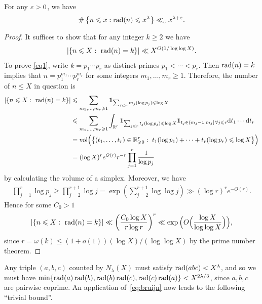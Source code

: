 \begin{lemma}\label{lem:deBruijnRadical}
  For any $\varepsilon>0$, we have
  \begin{equation}\label{eq:bruijn}
    \#\left\{n\leqslant x : \operatorname{rad}(n)\leqslant x^\lambda\right\} \ll_\varepsilon x^{\lambda+\varepsilon}.
  \end{equation}
\end{lemma}
\begin{proof}

  It suffices to show that for any integer $k\geq 2$ we have
  \begin{align}\label{eq1}
  |\{n\leqslant X:\,\, \operatorname{rad}(n)=k\}|\ll X^{O(1/\log \log X)}.
  \end{align}
  To prove \eqref{eq1}, write $k=p_1\cdots p_r$ as distinct primes $p_1<\cdots <p_r$. Then $\operatorname{rad}(n)=k$ implies that $n=p_1^{m_1}\cdots p_{r}^{m_r}$ for some integers $m_1,\ldots, m_r\geq 1$. Therefore, the number of $n\leq X$ in question is
  \begin{align*}
  |\{n\leqslant X:\,\, \operatorname{rad}(n)=k\}| &\leqslant \sum_{m_1,\ldots, m_r\geqslant 1}\mathbf{1}_{\sum_{j\leqslant r}m_j(\log p_j)\leqslant \log X}\\
  &\leqslant \sum_{m_1,\ldots, m_r\geqslant 1}\int_{\mathbb{R}^r}\mathbf{1}_{\sum_{j\leqslant r}t_j(\log p_j)\leqslant \log X}\mathbf{1}_{t_j\in (m_j-1,m_j]\, \forall j\leqslant r} \textnormal{d} t_1\cdots \textnormal{d} t_r\\
  &=\textnormal{vol}\Big(\big\{(t_1,\ldots, t_r)\in \mathbb{R}_{\geqslant 0}^r:\,\, t_1(\log p_1)+\cdots +t_r(\log p_r)\leqslant \log X\big\}\Big)\\
  &=(\log X)^re^{O(r)}r^{-r}\prod_{j=1}^r \frac{1}{\log p_j}
  \end{align*}
  by calculating the volume of a simplex. Moreover, we have
  \begin{align*}
  \prod_{j=1}^r \log p_j\geq \prod_{j=2}^{r+1}\log j=\exp\left(\sum_{j=2}^{r+1}\log \log j\right)\gg (\log r)^{r}e^{-O(r)}.
  \end{align*}
  Hence for some $C_0>1$
  \begin{align*}
  |\{n\leqslant X:\,\, \operatorname{rad}(n)=k\}| \ll \left(\frac{C_0\log X}{r\log r}\right)^r\ll
  \exp\Big(O\Big(\frac{\log X}{\log\log X}\Big)\Big),
  \end{align*}
  since $r=\omega(k)\leq (1+o(1))(\log X)/(\log \log X)$ by the prime number theorem.

\end{proof}

Any triple $(a,b,c)$ counted by
$N_\lambda(X)$ must satisfy $\operatorname{rad}(abc)< X^{\lambda}$, and so
we must have
$\min\{\operatorname{rad}(a)\operatorname{rad}(b),\operatorname{rad}(b)\operatorname{rad}(c),\operatorname{rad}(c)\operatorname{rad}(a)\}< X^{2\lambda/3}$, since $a,b,c$ are pairwise coprime.
An application of~\eqref{eq:bruijn} now leads to the following ``trivial bound''.

